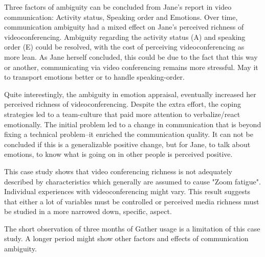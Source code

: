 \documentclass[man]{apa7}
\begin{document}
Three factors of ambiguity can be concluded from Jane's report in video communication: Activity status, Speaking order and Emotions. Over time, communication ambiguity had a mixed effect on Jane's perceived richness of videoconferencing. Ambiguity regarding the activity status (A) and speaking order (E) could be resolved, with the cost of perceiving videoconferencing as more lean. As Jane herself concluded, this could be due to the fact that this way or another, communicating via video conferencing remains more stressful. May it to transport emotions better or to handle speaking-order.

Quite interestingly, the ambiguity in emotion appraisal, eventually increased her perceived richness of videoconferencing. Despite the extra effort, the coping strategies led to a team-culture that paid more attention to verbalize/react emotionally. The initial problem led to a change in communication that is beyond fixing a technical problem–it enriched the communication quality. It can not be concluded if this is a generalizable positive change, but for Jane, to talk about emotions, to know what is going on in other people is perceived positive.

This case study shows that video conferencing richness is not adequately described by characteristics which generally are assumed to cause "Zoom fatigue". Individual experiences with videoconferencing might vary. This result suggests that either a lot of variables must be controlled or perceived media richness must be studied in a more narrowed down, specific, aspect.

The short observation of three months of Gather usage is a limitation of this case study. A longer period might show other factors and effects of communication ambiguity.

\printbibliography

\appendix
\end{document}
